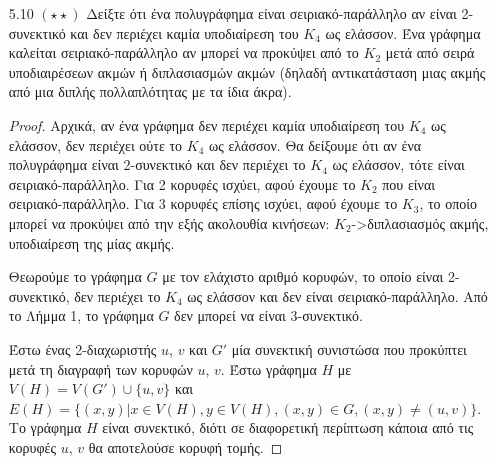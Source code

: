 \documentclass[a4paper, oneside, 11pt]{article}
\theoremstyle{definition}
\begin{document}
\begin{enumerate}
\begin{proof}
      Όπου το 4ο βήμα προκύπτει από την ανισότητα Cauchy-Schwarz:

      \begin{align*}
         d(u_1)\cdot1 + d(u_2)\cdot2 + \ldots + d(u_n)\cdot1
         &\leq (d^2(u_1) + \ldots + d^2(u_n)) \cdot (1 + \ldots + 1)\\
         &= (d^2(u_1) + \ldots + d^2(u_n)) \cdot n
      \end{align*}

      \end{proof}

   \item[5.10 $(\star \star)$]
Δείξτε ότι ένα πολυγράφημα είναι σειριακό-παράλληλο αν είναι 2-συνεκτικό και δεν περιέχει καμία υποδιαίρεση του $K_4$ ως ελάσσον. Ένα γράφημα καλείται σειριακό-παράλληλο αν μπορεί
να προκύψει από το $K_2$ μετά από σειρά υποδιαιρέσεων ακμών ή διπλασιασμών ακμών (δηλαδή αντικατάσταση μιας ακμής από μια διπλής πολλαπλότητας με τα ίδια άκρα).
	\begin{proof}
Αρχικά, αν ένα γράφημα δεν περιέχει καμία υποδιαίρεση του $K_4$ ως ελάσσον, δεν περιέχει ούτε το $K_4$ ως ελάσσον.
Θα δείξουμε ότι αν ένα πολυγράφημα είναι 2-συνεκτικό και δεν περιέχει το $K_4$ ως ελάσσον, τότε είναι σειριακό-παράλληλο.
Για 2 κορυφές ισχύει, αφού έχουμε το $K_2$ που είναι σειριακό-παράλληλο.
Για 3 κορυφές επίσης ισχύει, αφού έχουμε το $K_3$, το οποίο μπορεί να προκύψει από την εξής ακολουθία κινήσεων: 
$K_2$->διπλασιασμός ακμής, υποδιαίρεση της μίας ακμής.

Θεωρούμε το γράφημα $G$ με τον ελάχιστο αριθμό κορυφών, το οποίο είναι 2-συνεκτικό, δεν περιέχει το $K_4$ ως ελάσσον και δεν είναι σειριακό-παράλληλο. Από το Λήμμα 1, το γράφημα $G$ δεν μπορεί
να είναι 3-συνεκτικό. 

Έστω ένας 2-διαχωριστής $u$, $v$ και $G'$ μία συνεκτική συνιστώσα που προκύπτει μετά τη διαγραφή των κορυφών $u$, $v$. Έστω γράφημα $H$ με 
$V(H)=V(G')\cup \{u,v\}$ και $E(H) = \{(x,y) | x\in V(H), y\in V(H), (x,y)\in G, (x,y)\neq (u,v)\}$. Το γράφημα $H$ είναι συνεκτικό, διότι σε διαφορετική περίπτωση κάποια από τις κορυφές 
$u$, $v$ θα αποτελούσε κορυφή τομής. 


\end{proof}
\end{enumerate}
\end{document}

